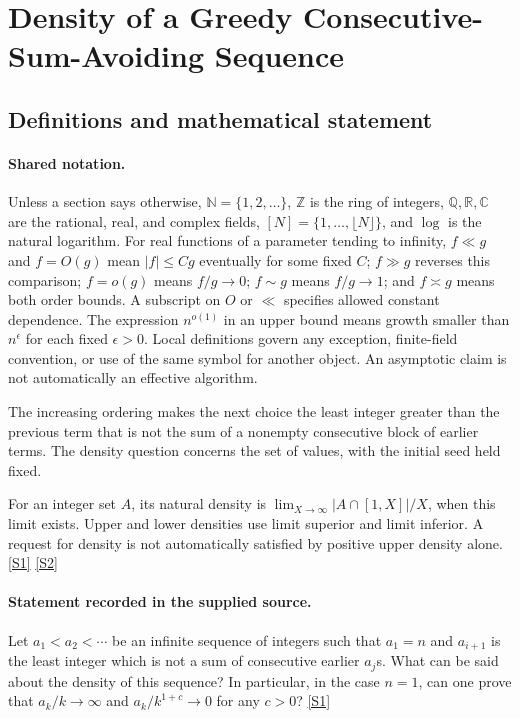 \documentclass[11pt,a4paper]{article}
\newcommand{\N}{\mathbb{N}}
\newcommand{\Z}{\mathbb{Z}}
\newcommand{\Q}{\mathbb{Q}}
\newcommand{\R}{\mathbb{R}}
\newcommand{\C}{\mathbb{C}}
\newcommand{\sref}[2]{\hyperlink{source:#1:#2}{[S#2]}}
\begin{document}
\section{Density of a Greedy Consecutive-Sum-Avoiding Sequence}\label{statement}


\subsection{Definitions and mathematical statement}

\paragraph{Shared notation.}Unless a section says otherwise, $\N=\{1,2,\ldots\}$,
$\Z$ is the ring of integers, $\Q,\R,\C$ are the rational, real, and complex
fields, $[N]=\{1,\ldots,\lfloor N\rfloor\}$, and $\log$ is the natural
logarithm. For real functions of a parameter tending to infinity,
$f\ll g$ and $f=O(g)$ mean $|f|\leq Cg$ eventually for some fixed $C$;
$f\gg g$ reverses this comparison; $f=o(g)$ means $f/g\to0$;
$f\sim g$ means $f/g\to1$; and $f\asymp g$ means both order bounds.
A subscript on $O$ or $\ll$ specifies allowed constant dependence.
The expression $n^{o(1)}$ in an upper bound means growth smaller than
$n^\epsilon$ for each fixed $\epsilon>0$. Local definitions govern any
exception, finite-field convention, or use of the same symbol for another
object. An asymptotic claim is not automatically an effective algorithm.



The increasing ordering makes the next choice the least integer greater than the previous term that is not the sum of a nonempty consecutive block of earlier terms. The density question concerns the set of values, with the initial seed held fixed.

For an integer set $A$, its natural density is $\lim_{X\to\infty}|A\cap[1,X]|/X$, when this limit exists. Upper and lower densities use limit superior and limit inferior. A request for density is not automatically satisfied by positive upper density alone. \sref{statement}{1} \sref{statement}{2}

\paragraph{Statement recorded in the supplied source.}
Let $a_1<a_2<\cdots$ be an infinite sequence of integers such that $a_1=n$ and $a_{i+1}$ is the least integer which is not a sum of consecutive earlier $a_j$s. What can be said about the density of this sequence?
In particular, in the case $n=1$, can one prove that $a_k/k\to \infty$ and $a_k/k^{1+c}\to 0$ for any $c>0$? \sref{statement}{1}
\end{document}
